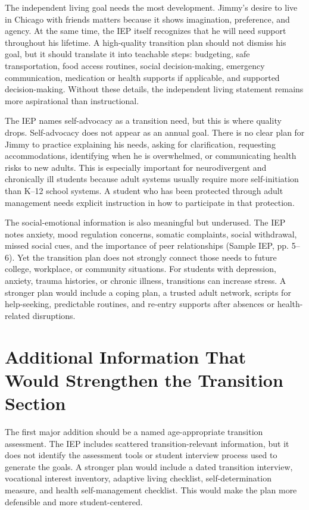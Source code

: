 \documentclass[11pt]{article}
\begin{document}
The independent living goal needs the most development. Jimmy's desire to live in Chicago with friends matters because it shows imagination, preference, and agency. At the same time, the IEP itself recognizes that he will need support throughout his lifetime. A high-quality transition plan should not dismiss his goal, but it should translate it into teachable steps: budgeting, safe transportation, food access routines, social decision-making, emergency communication, medication or health supports if applicable, and supported decision-making. Without these details, the independent living statement remains more aspirational than instructional.

The IEP names self-advocacy as a transition need, but this is where quality drops. Self-advocacy does not appear as an annual goal. There is no clear plan for Jimmy to practice explaining his needs, asking for clarification, requesting accommodations, identifying when he is overwhelmed, or communicating health risks to new adults. This is especially important for neurodivergent and chronically ill students because adult systems usually require more self-initiation than K--12 school systems. A student who has been protected through adult management needs explicit instruction in how to participate in that protection.

The social-emotional information is also meaningful but underused. The IEP notes anxiety, mood regulation concerns, somatic complaints, social withdrawal, missed social cues, and the importance of peer relationships (Sample IEP, pp. 5--6). Yet the transition plan does not strongly connect those needs to future college, workplace, or community situations. For students with depression, anxiety, trauma histories, or chronic illness, transitions can increase stress. A stronger plan would include a coping plan, a trusted adult network, scripts for help-seeking, predictable routines, and re-entry supports after absences or health-related disruptions.

\section{Additional Information That Would Strengthen the Transition Section}

The first major addition should be a named age-appropriate transition assessment. The IEP includes scattered transition-relevant information, but it does not identify the assessment tools or student interview process used to generate the goals. A stronger plan would include a dated transition interview, vocational interest inventory, adaptive living checklist, self-determination measure, and health self-management checklist. This would make the plan more defensible and more student-centered.
\end{document}
